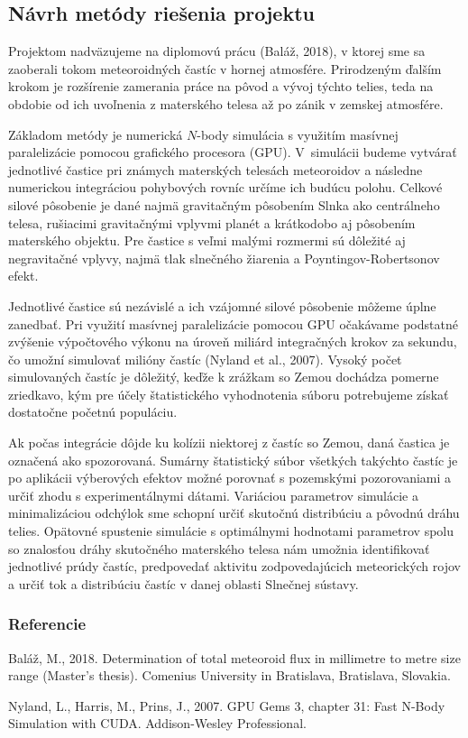 \hypertarget{nuxe1vrh-metuxf3dy-rieux161enia-projektu}{%
\subsection{Návrh metódy riešenia
projektu}\label{nuxe1vrh-metuxf3dy-rieux161enia-projektu}}

Projektom nadväzujeme na diplomovú prácu (Baláž, 2018), v ktorej sme sa
zaoberali tokom meteoroidných častíc v hornej atmosfére. Prirodzeným
ďalším krokom je rozšírenie zamerania práce na pôvod a vývoj týchto
telies, teda na obdobie od ich uvoľnenia z materského telesa až po zánik
v zemskej atmosfére.

Základom metódy je numerická \(N\)-body simulácia s využitím masívnej
paralelizácie pomocou grafického procesora (GPU). V~simulácii budeme
vytvárať jednotlivé častice pri známych materských telesách meteoroidov
a následne numerickou integráciou pohybových rovníc určíme ich budúcu
polohu. Celkové silové pôsobenie je dané najmä gravitačným pôsobením
Slnka ako centrálneho telesa, rušiacimi gravitačnými vplyvmi planét a
krátkodobo aj pôsobením materského objektu. Pre častice s veľmi malými
rozmermi sú dôležité aj negravitačné vplyvy, najmä tlak slnečného
žiarenia a Poyntingov-Robertsonov efekt.

Jednotlivé častice sú nezávislé a ich vzájomné silové pôsobenie môžeme
úplne zanedbať. Pri využití masívnej paralelizácie pomocou GPU očakávame
podstatné zvýšenie výpočtového výkonu na úroveň miliárd integračných
krokov za sekundu, čo umožní simulovať milióny častíc (Nyland et al.,
2007). Vysoký počet simulovaných častíc je dôležitý, keďže k zrážkam so
Zemou dochádza pomerne zriedkavo, kým pre účely štatistického
vyhodnotenia súboru potrebujeme získať dostatočne početnú populáciu.

Ak počas integrácie dôjde ku kolízii niektorej z častíc so Zemou, daná
častica je označená ako spozorovaná. Sumárny štatistický súbor všetkých
takýchto častíc je po aplikácii výberových efektov možné porovnať s
pozemskými pozorovaniami a určiť zhodu s experimentálnymi dátami.
Variáciou parametrov simulácie a minimalizáciou odchýlok sme schopní
určiť skutočnú distribúciu a pôvodnú dráhu telies. Opätovné spustenie
simulácie s optimálnymi hodnotami parametrov spolu so znalosťou dráhy
skutočného materského telesa nám umožnia identifikovať jednotlivé prúdy
častíc, predpovedať aktivitu zodpovedajúcich meteorických rojov a určiť
tok a distribúciu častíc v danej oblasti Slnečnej sústavy.

\hypertarget{referencie}{%
\subsubsection*{Referencie}\label{referencie}}

\hypertarget{refs}{}
\leavevmode\hypertarget{ref-balaz2018}{}%
Baláž, M., 2018. Determination of total meteoroid flux in millimetre to
metre size range (Master's thesis). Comenius University in Bratislava,
Bratislava, Slovakia.

\leavevmode\hypertarget{ref-nyland2007}{}%
Nyland, L., Harris, M., Prins, J., 2007. GPU Gems 3, chapter 31: Fast
N-Body Simulation with CUDA. Addison-Wesley Professional.
